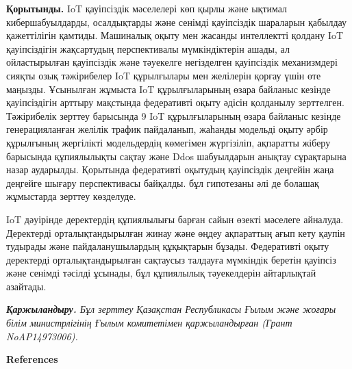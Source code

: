 {\bfseries Қорытынды.} IoT қауіпсіздік мәселелері көп қырлы және ықтимал
кибершабуылдарды, осалдықтарды және сенімді қауіпсіздік шараларын
қабылдау қажеттілігін
қамтиды.\hspace{0pt}\hspace{0pt}\hspace{0pt}\hspace{0pt}\hspace{0pt}\hspace{0pt}\hspace{0pt}
Машиналық оқыту мен жасанды интеллектті қолдану IoT қауіпсіздігін
жақсартудың перспективалы мүмкіндіктерін ашады, ал ойластырылған
қауіпсіздік және тәуекелге негізделген қауіпсіздік механизмдері сияқты
озық тәжірибелер IoT құрылғылары мен желілерін қорғау үшін өте маңызды.
Ұсынылған жұмыста IoT құрылғыларының өзара байланыс кезінде
қауіпсіздігін арттыру мақстында федеративті оқыту әдісін қолданылу
зерттелген. Тәжірибелік зерттеу барысында 9 IoT құрылғыларының өзара
байланыс кезінде генерацияланған желілік трафик пайдаланып, жаһанды
модельді оқыту әрбір құрылғының жергілікті модельдердің көмегімен
жүргізіліп, ақпаратты жіберу барысында құпиялылықты сақтау және Ddos
шабуылдарын анықтау сұрақтарына назар аударылды. Қорытында федеративті
оқытудың қауіпсіздік деңгейін жаңа деңгейге шығару перспективасы
байқалды. бұл гипотезаны әлі де болашақ жұмыстарда зерттеу көзделуде.

IoT дәуірінде деректердің құпиялылығы барған сайын өзекті мәселеге
айналуда. Деректерді орталықтандырылған жинау және өңдеу ақпараттың ағып
кету қаупін тудырады және пайдаланушылардың құқықтарын бұзады.
Федеративті оқыту деректерді орталықтандырылған сақтаусыз талдауға
мүмкіндік беретін қауіпсіз және сенімді тәсілді ұсынады, бұл құпиялылық
тәуекелдерін айтарлықтай азайтады.

\emph{{\bfseries Қаржыландыру.} Бұл зерттеу Қазақстан Республикасы Ғылым
және жоғары білім министрлігінің Ғылым комитетімен қаржыландырған (Грант
NoAP14973006).}



\begin{center}
  {\bfseries References}
  \end{center}

